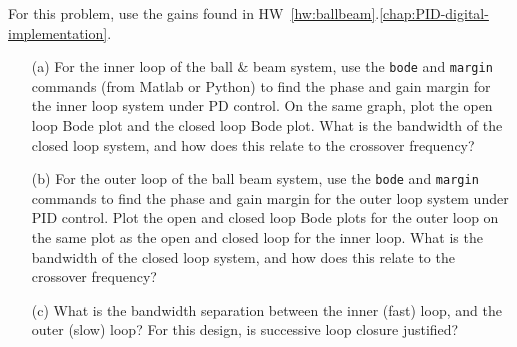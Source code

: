 For this problem, use the gains found in HW~\ref{hw:ballbeam}.\ref{chap:PID-digital-implementation}.
\begin{itemize}
\item[(a)]  For the inner loop of the ball \& beam system, use the \texttt{bode} and \texttt{margin} commands (from Matlab or Python) to find the phase and gain margin for the inner loop system under PD control.  On the same graph, plot the open loop Bode plot and the closed loop Bode plot.  What is the bandwidth of the closed loop system, and how does this relate to the crossover frequency?

\item[(b)]  For the outer loop of the ball beam system, use the \texttt{bode} and \texttt{margin} commands to find the phase and gain margin for the outer loop system under PID control.  Plot the open and closed loop Bode plots for the outer loop on the same plot as the open and closed loop for the inner loop.  What is the bandwidth of the closed loop system, and how does this relate to the crossover frequency?

\item[(c)]  What is the bandwidth separation between the inner (fast) loop, and the outer (slow) loop?  For this design, is successive loop closure justified?
\end{itemize}
